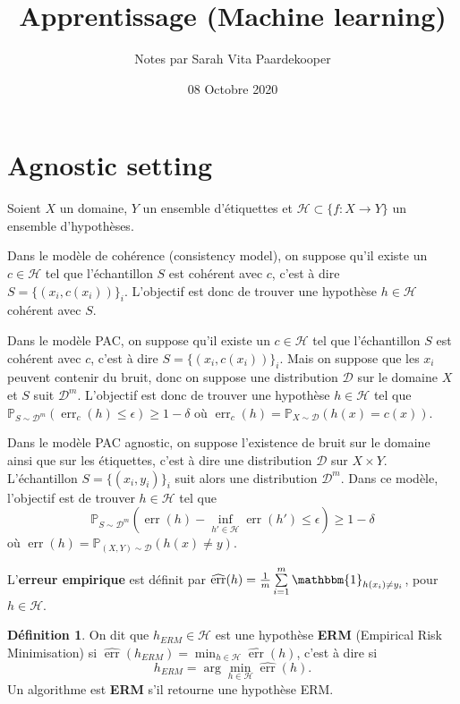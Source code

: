 \documentclass{article}
\title{Apprentissage (Machine learning)}
\author{Notes par Sarah Vita Paardekooper}
\date{08 Octobre 2020}
\DeclareMathOperator{\err}{err}
\theoremstyle{plain}
\theoremstyle{remark}
\theoremstyle{definition}
\newtheorem{defin}[thrm]{Définition}
\begin{document}
\maketitle

\setcounter{section}{2}

\section{Agnostic setting}


Soient $X$ un domaine, $Y$ un ensemble d'étiquettes et $\mathcal{H}\subset \{f : X \rightarrow Y \}$ un ensemble d'hypothèses.

Dans le modèle de cohérence (consistency model), on suppose qu'il existe un $c\in\mathcal{H}$ tel que l'échantillon $S$ est cohérent avec $c$, c'est à dire $S=\{(x_i,c(x_i))\}_i$. L'objectif est donc de trouver une hypothèse $h\in \mathcal{H}$ cohérent avec $S$.

Dans le modèle PAC, on suppose qu'il existe un $c\in\mathcal{H}$ tel que l'échantillon $S$ est cohérent avec $c$, c'est à dire $S=\{(x_i,c(x_i))\}_i$. Mais on suppose que les $x_i$ peuvent contenir du bruit, donc on suppose une distribution $\mathcal{D}$ sur le domaine $X$ et $S$ suit $\mathcal{D}^m$. L'objectif est donc de trouver une hypothèse $h\in\mathcal{H}$ tel que $\mathbb{P}_{S\sim \mathcal{D}^m}(\err_c(h)\leq \epsilon)\geq 1-\delta$ où $\err_c(h)=\mathbb{P}_{X\sim\mathcal{D}}(h(x)=c(x))$.

Dans le modèle PAC agnostic, on suppose l'existence de bruit sur le domaine ainsi que sur les étiquettes, c'est à dire une distribution $\mathcal{D}$ sur $X\times Y$. L'échantillon $S=\{(x_i,y_i)\}_i$ suit alors une distribution $\mathcal{D}^m$. Dans ce modèle, l'objectif est de trouver $h\in\mathcal{H}$ tel que 
$$ \mathbb{P}_{S\sim\mathcal{D}^m} (\err(h)-\inf_{h'\in\mathcal{H}} \err(h')\leq \epsilon ) \geq 1- \delta $$
où $\err(h)=\mathbb{P}_{(X,Y)\sim\mathcal{D}} (h(x)\neq y)$.

L'\textbf{erreur empirique} est définit par $\widehat{\err}(h)= \frac{1}{m} \sum\limits_{i=1}^{m} \mathbbm{1}_{h(x_i)\neq y_i}$, pour $h\in\mathcal{H}$.

\begin{defin}
    On dit que $h_{ERM}\in \mathcal{H}$ est une hypothèse \textbf{ERM} (Empirical Risk Minimisation) si $\widehat{\err}(h_{ERM})= \min_{h\in \mathcal{H}} \widehat{\err}(h)$, c'est à dire si
    $$ h_{ERM}= \arg \min_{h\in \mathcal{H}} \widehat{\err}(h) .$$
    Un algorithme est \textbf{ERM} s'il retourne une hypothèse ERM.
\end{defin}
\end{document}
